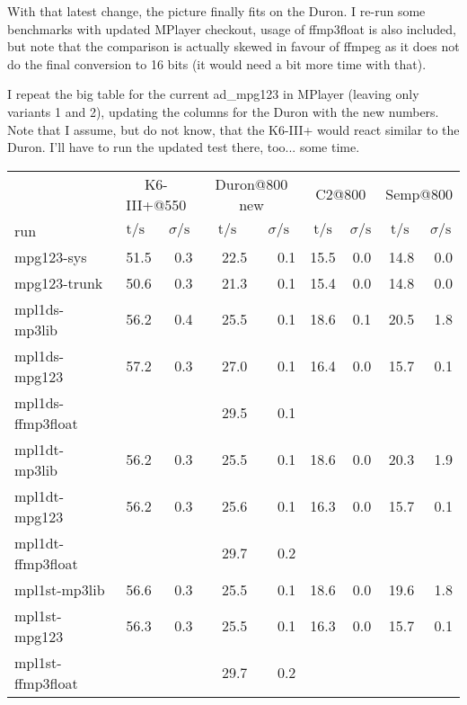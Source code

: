 \documentclass[a4paper,12pt]{scrartcl}
\newcommand{\tsigma}[0]{\multicolumn{1}{c}{$\text{t}/\text{s}$} & \multicolumn{1}{c}{$\sigma/\text{s}$}}
\begin{document}
With that latest change, the picture finally fits on the Duron.
I re-run some benchmarks with updated MPlayer checkout, usage of ffmp3float is also included, but note that the comparison is actually skewed in favour of ffmpeg as it does not do the final conversion to 16 bits (it would need a bit more time with that).

I repeat the big table for the current ad\_mpg123 in MPlayer (leaving only variants 1 and 2), updating the columns for the Duron with the new numbers. Note that I assume, but do not know, that the K6-III+ would react similar to the Duron.
I'll have to run the updated test there, too... some time.
\begin{center}
\begin{tabular}{lrrrrrrrr}
    & \multicolumn{2}{c}{K6-III+@550} & \multicolumn{2}{c}{Duron@800 new} & \multicolumn{2}{c}{C2@800} & \multicolumn{2}{c}{Semp@800} \\
run & \tsigma & \tsigma & \tsigma & \tsigma \\
\midrule
\midrule
mpg123-sys    & 51.5&0.3 & 22.5&0.1               & 15.5&0.0               & 14.8&0.0 \\
mpg123-trunk  & 50.6&0.3 & 21.3&0.1               & 15.4&0.0               & 14.8&0.0 \\
\midrule
mpl1ds-mp3lib & 56.2&0.4 & 25.5&0.1               & 18.6&0.1               & 20.5&1.8 \\
mpl1ds-mpg123 & 57.2&0.3 & 27.0&0.1               & 16.4&0.0               & 15.7&0.1 \\
mpl1ds-ffmp3float
              &     &    & 29.5&0.1               &     &                  &     &    \\
mpl1dt-mp3lib & 56.2&0.3 & 25.5&0.1               & 18.6&0.0               & 20.3&1.9 \\
mpl1dt-mpg123 & 56.2&0.3 & 25.6&0.1               & 16.3&0.0               & 15.7&0.1 \\
mpl1dt-ffmp3float
              &     &    & 29.7&0.2               &     &                  &     &    \\
mpl1st-mp3lib & 56.6&0.3 & 25.5&0.1               & 18.6&0.0               & 19.6&1.8 \\
mpl1st-mpg123 & 56.3&0.3 & 25.5&0.1               & 16.3&0.0               & 15.7&0.1 \\
mpl1st-ffmp3float
              &     &    & 29.7&0.2               &     &                  &     &    \\
\midrule

\end{tabular}
\end{center}
\end{document}
